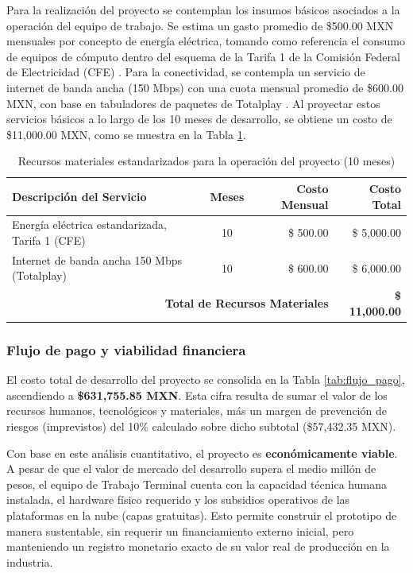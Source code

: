 Para la realización del proyecto se contemplan los insumos básicos asociados a la operación del equipo de trabajo. Se estima un gasto promedio de \$500.00 MXN mensuales por concepto de energía eléctrica, tomando como referencia el consumo de equipos de cómputo dentro del esquema de la Tarifa 1 de la Comisión Federal de Electricidad (CFE) \cite{cfe_tarifa1}. Para la conectividad, se contempla un servicio de internet de banda ancha (150 Mbps) con una cuota mensual promedio de \$600.00 MXN, con base en tabuladores de paquetes de Totalplay \cite{totalplay_paquetes}. Al proyectar estos servicios básicos a lo largo de los 10 meses de desarrollo, se obtiene un costo de \$11,000.00 MXN, como se muestra en la Tabla \ref{tab:recursos_materiales}.

\begin{table}[htbp]
    \centering
    \caption{Recursos materiales estandarizados para la operación del proyecto (10 meses)}
    \label{tab:recursos_materiales}
    \begin{tabular}{|p{}|c|r|r|}
        \hline
        \textbf{Descripción del Servicio} & \textbf{Meses} & \textbf{Costo Mensual} & \textbf{Costo Total} \\ \hline
        Energía eléctrica estandarizada, Tarifa 1 (CFE) & 10 & \$ 500.00 & \$ 5,000.00 \\ \hline
        Internet de banda ancha 150 Mbps (Totalplay) & 10 & \$ 600.00 & \$ 6,000.00 \\ \hline
        \multicolumn{3}{|r|}{\textbf{Total de Recursos Materiales}} & \textbf{\$ 11,000.00} \\ \hline
    \end{tabular}
\end{table}

\subsubsection{Flujo de pago y viabilidad financiera}

El costo total de desarrollo del proyecto se consolida en la Tabla \ref{tab:flujo_pago}, ascendiendo a \textbf{\$631,755.85 MXN}. Esta cifra resulta de sumar el valor de los recursos humanos, tecnológicos y materiales, más un margen de prevención de riesgos (imprevistos) del 10\% calculado sobre dicho subtotal (\$57,432.35 MXN). 

Con base en este análisis cuantitativo, el proyecto es \textbf{económicamente viable}. A pesar de que el valor de mercado del desarrollo supera el medio millón de pesos, el equipo de Trabajo Terminal cuenta con la capacidad técnica humana instalada, el hardware físico requerido y los subsidios operativos de las plataformas en la nube (capas gratuitas). Esto permite construir el prototipo de manera sustentable, sin requerir un financiamiento externo inicial, pero manteniendo un registro monetario exacto de su valor real de producción en la industria.

